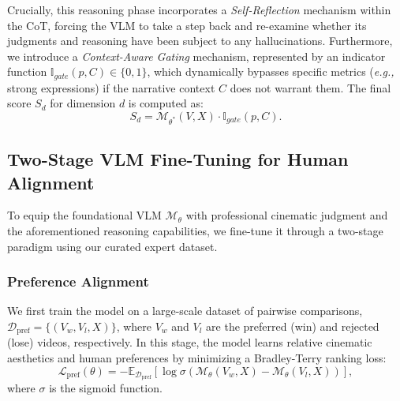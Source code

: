 \documentclass{llmxive}
\begin{document}
Crucially, this reasoning phase incorporates a \textit{Self-Reflection} mechanism within the CoT, forcing the VLM to take a step back and re-examine whether its judgments and reasoning have been subject to any hallucinations. Furthermore, we introduce a \textit{Context-Aware Gating} mechanism, represented by an indicator function $\mathbb{I}_{gate}(p, C) \in \{0, 1\}$, which dynamically bypasses specific metrics (\textit{e.g.,} strong expressions) if the narrative context $C$ does not warrant them. The final score $S_d$ for dimension $d$ is computed as:
\begin{equation}
    S_d = \mathcal{M}_{\theta^*}(V, X) \cdot \mathbb{I}_{gate}(p, C).
\end{equation}

\subsection{Two-Stage VLM Fine-Tuning for Human Alignment}
\label{sec: vlm fine_tuning}
To equip the foundational VLM $\mathcal{M}_{\theta}$ with professional cinematic judgment and the aforementioned reasoning capabilities, we fine-tune it through a two-stage paradigm using our curated expert dataset.

\subsubsection{Preference Alignment}
We first train the model on a large-scale dataset of pairwise comparisons, $\mathcal{D}_{\text{pref}} = \{ (V_{w}, V_{l}, X) \}$, where $V_w$ and $V_l$ are the preferred (win) and rejected (lose) videos, respectively. In this stage, the model learns relative cinematic aesthetics and human preferences by minimizing a Bradley-Terry ranking loss:
\begin{equation}
    \mathcal{L}_{\text{pref}}(\theta) = - \mathbb{E}_{\mathcal{D}_{\text{pref}}} \left[ \log \sigma \left( \mathcal{M}_{\theta}(V_w, X) - \mathcal{M}_{\theta}(V_l, X) \right) \right],
\end{equation}
where $\sigma$ is the sigmoid function.
\end{document}
